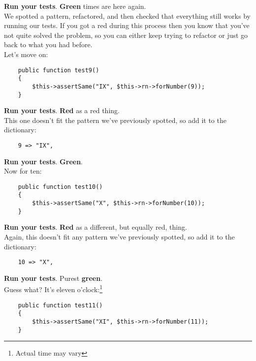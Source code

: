 \textbf{Run your tests}. \textbf{Green} times are here again.
\\

We spotted a pattern, refactored, and then checked that everything still works by running our tests. If you got a red during this process then you know that you've not quite solved the problem, so you can either keep trying to refactor or just go back to what you had before.
\\

Let's move on:

\begin{verbatim}
    public function test9()
    {
        $this->assertSame("IX", $this->rn->forNumber(9));
    }
\end{verbatim}

\textbf{Run your tests}. \textbf{Red} as a red thing.
\\

This one doesn't fit the pattern we've previously spotted, so add it to the dictionary:

\begin{verbatim}
    9 => "IX",
\end{verbatim}

\textbf{Run your tests}. \textbf{Green}.
\\

Now for ten:

\begin{verbatim}
    public function test10()
    {
        $this->assertSame("X", $this->rn->forNumber(10));
    }
\end{verbatim}

\textbf{Run your tests}. \textbf{Red} as\textellipsis{} a different, but equally red, thing.
\\

Again, this doesn't fit any pattern we've previously spotted, so add it to the dictionary:

\begin{verbatim}
    10 => "X",
\end{verbatim}

\textbf{Run your tests}. Purest \textbf{green}.
\\

Guess what? It's eleven o'clock:\footnote{Actual time may vary}

\begin{verbatim}
    public function test11()
    {
        $this->assertSame("XI", $this->rn->forNumber(11));
    }
\end{verbatim}

